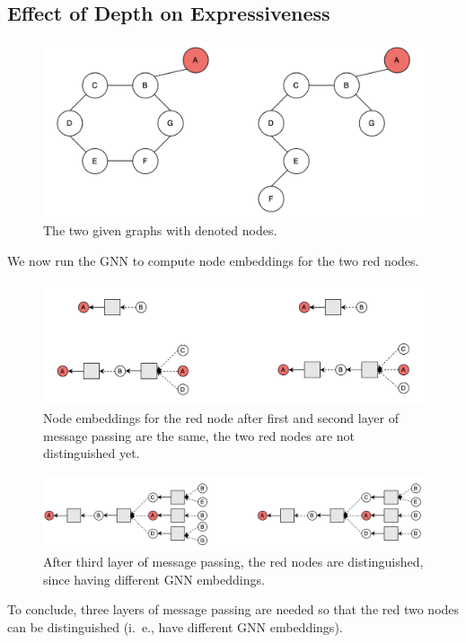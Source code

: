 \documentclass[a4paper,11pt]{article}
\begin{document}
\subsection{Effect of Depth on Expressiveness}

\begin{figure}[ht!]
    \centering
    \includegraphics[width=130mm]{Figures/4_1_graph.png}
    \caption{The two given graphs with denoted nodes.}
\end{figure}
\noindent
We now run the GNN to compute node embeddings for the two red nodes.

\begin{figure}[ht!]
    \centering
    \includegraphics[width=130mm]{Figures/4_1_1and2layer.png}
    \caption{Node embeddings for the red node after first and second layer of message passing are the same, the two red nodes are not distinguished yet.}
\end{figure}

\begin{figure}[ht!]
    \centering
    \includegraphics[width=130mm]{Figures/4_1_3layer.png}
    \caption{After third layer of message passing, the red nodes are distinguished, since having different GNN embeddings.}
\end{figure}
\noindent
To conclude, three layers of message passing are needed so that the red two nodes can be distinguished (i.~e., have different GNN embeddings).
\end{document}
